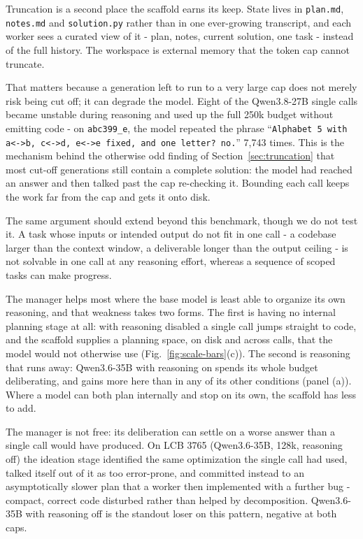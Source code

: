 \documentclass[journal]{IEEEtran}
\begin{document}
Truncation is a second place the scaffold earns its keep. State lives in \texttt{plan.md},
\texttt{notes.md} and \texttt{solution.py} rather than in one ever-growing transcript, and
each worker sees a curated view of it - plan, notes, current solution, one task - instead
of the full history. The workspace is external memory that the token cap cannot truncate.

That matters because a generation left to run to a very large cap does not merely risk being
cut off; it can degrade the model. Eight of the Qwen3.8-27B single calls became unstable during reasoning and
used up the full 250k budget without emitting code - on \texttt{abc399\_e},
the model repeated the phrase ``\texttt{Alphabet 5 with a<->b, c<->d, e<->e fixed, and one letter? no.}'' 7{,}743 times.
This is the mechanism behind the otherwise odd finding of Section~\ref{sec:truncation} that most
cut-off generations still contain a complete solution: the model had reached an answer and
then talked past the cap re-checking it. Bounding each call keeps the work far from the cap and
gets it onto disk.

The same argument should extend beyond this benchmark, though we do not test it. A task whose
inputs or intended output do not fit in one call - a codebase larger than the context window,
a deliverable longer than the output ceiling - is not solvable in one call at any reasoning
effort, whereas a sequence of scoped tasks can make progress.

The manager helps most where the base model is least able to organize its own reasoning, and
that weakness takes two forms. The first is having no internal planning stage at all: with
reasoning disabled a single call jumps straight to code, and the scaffold supplies a planning
space, on disk and across calls, that the model would not otherwise use
(Fig.~\ref{fig:scale-bars}(c)). The second is reasoning that runs away: Qwen3.6-35B with
reasoning on spends its whole budget deliberating, and gains more here than in any of its other
conditions (panel (a)). Where a model can both plan internally and stop on
its own, the scaffold has less to add.

The manager is not free: its deliberation can settle on a worse answer than a single call would
have produced. On LCB 3765 (Qwen3.6-35B, 128k, reasoning off) the ideation stage identified the
same optimization the single call had used, talked itself out of it as too error-prone, and
committed instead to an asymptotically slower plan that a worker then implemented with a further
bug - compact, correct code disturbed rather than helped by decomposition. Qwen3.6-35B with
reasoning off is the standout loser on this pattern, negative at both caps.
\end{document}
